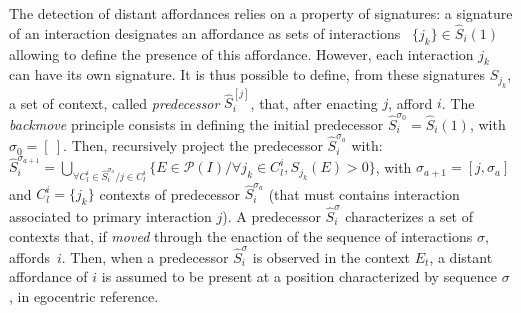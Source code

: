 \documentclass[conference]{IEEEtran}
\begin{document}

The detection of distant affordances relies on a property of signatures: a signature of an interaction designates an affordance as sets of interactions ~$\{j_k\} \in \hat{S}_i(1)$ allowing to define the presence of this affordance.
However, each interaction $j_k$ can have its own signature. It is thus possible to define, from these signatures $S_{j_k}$, a set of context, called \textit{predecessor} $\hat{S}_i^{[j]}$, that, after enacting $j$, afford $i$. The \textit{backmove} principle consists in defining the initial predecessor $\hat{S}_i^{\sigma_0}=\hat{S}_i(1)$, with $\sigma_0=[~]$. Then, recursively project the predecessor $\hat{S}_i^{\sigma_a}$ with:
$\hat{S}_i^{\sigma_{a+1}}\!=\!\bigcup_{\forall C_l^i \in \hat{S}_i^{\sigma_a} / j \in C_l^i} \{E \in \mathcal{P}(I) / \forall j_k \in C_l^i, S_{j_k}(E)\!>\!0\}$,
with $\sigma_{a+1}=[j,\sigma_a]$ and $C_l^i=\{j_k\}$ contexts of predecessor $\hat{S}_i^{\sigma_a}$ (that must contains interaction associated to primary interaction $j$).
A predecessor $\hat{S}_i^\sigma$ characterizes a set of contexts that, if \textit{moved} through the enaction of the sequence of interactions $\sigma$, affords~$i$. Then, when a predecessor $\hat{S}_i^\sigma$ is observed in the context $E_t$, a distant affordance of $i$ is assumed to be present at a position characterized by sequence $\sigma$, in egocentric reference.


\end{document}
